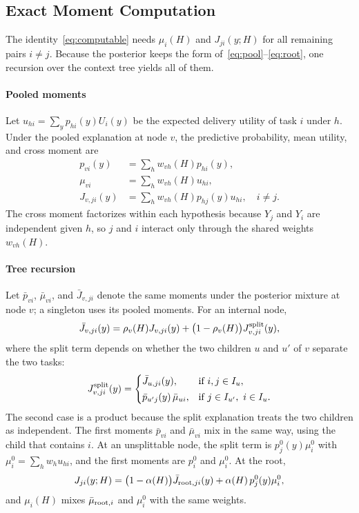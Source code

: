\documentclass[journal]{IEEEtran}
\begin{document}
\subsection{Exact Moment Computation}
\label{sec:moments}

The identity~\eqref{eq:computable} needs $\mu_i(H)$ and $J_{ji}(y;H)$ for all remaining pairs $i\ne j$. Because the posterior keeps the form of~\eqref{eq:pool}--\eqref{eq:root}, one recursion over the context tree yields all of them.

\paragraph{Pooled moments}
Let $u_{hi}=\sum_y p_{hi}(y)U_i(y)$ be the expected delivery utility of task $i$ under $h$. Under the pooled explanation at node $v$, the predictive probability, mean utility, and cross moment are
\begin{align}
 p_{vi}(y)&=\sum_h w_{vh}(H)p_{hi}(y),\\
 \mu_{vi}&=\sum_h w_{vh}(H)u_{hi},\\
 J_{v,ji}(y)&=\sum_h w_{vh}(H)p_{hj}(y)u_{hi},\quad i\ne j.
\end{align}
The cross moment factorizes within each hypothesis because $Y_j$ and $Y_i$ are independent given $h$, so $j$ and $i$ interact only through the shared weights $w_{vh}(H)$.

\paragraph{Tree recursion}
Let $\bar p_{vi}$, $\bar\mu_{vi}$, and $\bar J_{v,ji}$ denote the same moments under the posterior mixture at node $v$; a singleton uses its pooled moments. For an internal node,
\begin{equation}
 \bar J_{v,ji}(y)=\rho_v(H)J_{v,ji}(y)+\bigl(1-\rho_v(H)\bigr)J^{\rm split}_{v,ji}(y),
 \label{eq:moment-recursion}
\end{equation}
where the split term depends on whether the two children $u$ and $u'$ of $v$ separate the two tasks:
\begin{equation*}
 J^{\rm split}_{v,ji}(y)=
 \begin{cases}
 \bar J_{u,ji}(y), & \text{if } i,j\in I_u,\\[2pt]
 \bar p_{u'j}(y)\,\bar\mu_{ui}, & \text{if } j\in I_{u'},\ i\in I_u.
 \end{cases}
\end{equation*}
The second case is a product because the split explanation treats the two children as independent. The first moments $\bar p_{vi}$ and $\bar\mu_{vi}$ mix in the same way, using the child that contains $i$. At an unsplittable node, the split term is $p_j^0(y)\mu_i^0$ with $\mu_i^0=\sum_h w_h u_{hi}$, and the first moments are $p_i^0$ and $\mu_i^0$. At the root,
\begin{equation}
 J_{ji}(y;H)=\bigl(1-\alpha(H)\bigr)\bar J_{{\rm root},ji}(y)+\alpha(H)\,p_j^0(y)\mu_i^0,
 \label{eq:root-moments}
\end{equation}
and $\mu_i(H)$ mixes $\bar\mu_{{\rm root},i}$ and $\mu_i^0$ with the same weights.
\end{document}
